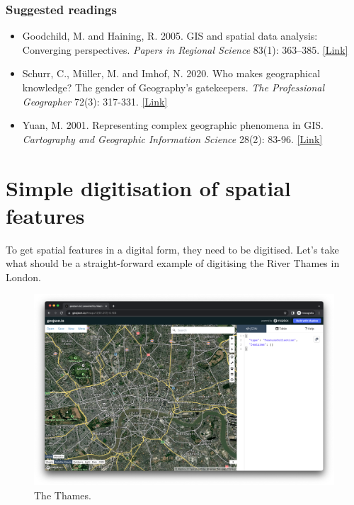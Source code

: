 \documentclass[
]{book}
\providecommand{\tightlist}{%
  \setlength{\itemsep}{0pt}\setlength{\parskip}{0pt}}
\begin{document}
\hypertarget{suggested-readings-1}{%
\subsubsection*{Suggested readings}\label{suggested-readings-1}}

\begin{itemize}
\tightlist
\item
  Goodchild, M. and Haining, R. 2005. GIS and spatial data analysis: Converging perspectives. \emph{Papers in Regional Science} 83(1): 363--385. \href{https://doi.org/10.1007/s10110-003-0190-y}{{[}Link{]}}
\item
  Schurr, C., Müller, M. and Imhof, N. 2020. Who makes geographical knowledge? The gender of Geography's gatekeepers. \emph{The Professional Geographer} 72(3): 317-331. \href{https://doi.org/10.1080/00330124.2020.1744169}{{[}Link{]}}
\item
  Yuan, M. 2001. Representing complex geographic phenomena in GIS. \emph{Cartography and Geographic Information Science} 28(2): 83-96. \href{https://doi.org/10.1559/152304001782173718}{{[}Link{]}}
\end{itemize}

\hypertarget{simple-digitisation-of-spatial-features}{%
\section{Simple digitisation of spatial features}\label{simple-digitisation-of-spatial-features}}

To get spatial features in a digital form, they need to be digitised. Let's take what should be a straight-forward example of digitising the River Thames in London.

\begin{figure}

{\centering \includegraphics[width=0.9\linewidth]{images/w02/river_thames} 

}

\caption{The Thames.}\label{fig:02-digitise}
\end{figure}
\end{document}
